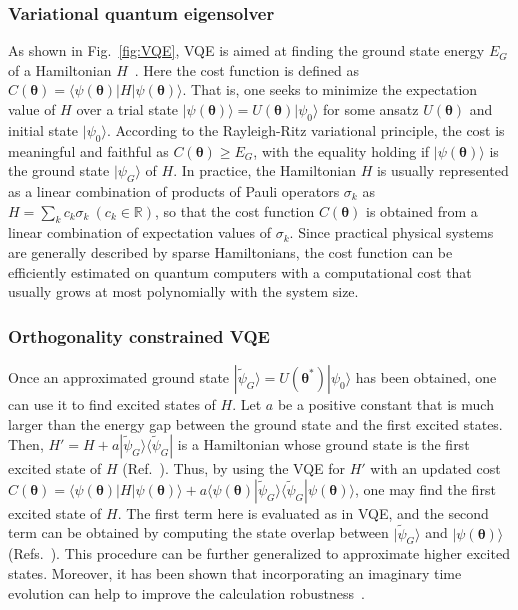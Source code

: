 \documentclass[prx,twocolumn,floatfix,superscriptaddress,longbibliography]{revtex4-1}
\renewcommand{\vec}[1]{\boldsymbol{#1}}  %
\newcommand{\<}{\langle}
\renewcommand{\>}{\rangle}
\newcommand{\ket}[1]{|#1\rangle}               %
\newcommand{\bra}[1]{\langle #1|}              %
\renewcommand{\geq}{\geqslant}
\renewcommand{\vec}[1]{\boldsymbol{#1}}  %
\begin{document}
\subsubsection{ Variational quantum eigensolver}  As shown in Fig.~\ref{fig:VQE}, VQE  is aimed at finding the ground state energy $E_G$ of a Hamiltonian $H$~\cite{VQE}. Here the cost function is defined as $C(\vec{\theta})=\bra{\psi(\vec{\theta})}H \ket{\psi(\vec{\theta})}$. That is, one seeks to minimize the expectation value of $H$ over a trial state $\ket{\psi(\vec{\theta})}=U(\vec{\theta})\ket{\psi_0}$ for some ansatz $U(\vec{\theta})$ and initial state $\ket{\psi_0}$. According to the Rayleigh-Ritz variational principle, the cost is meaningful and faithful as $C(\vec{\theta})\geq E_G$, with the equality holding if $\ket{\psi(\vec{\theta})}$ is the ground state $\ket{\psi_G}$ of $H$. In practice, the Hamiltonian $H$ is usually represented as a linear combination of products of Pauli operators $\sigma_k$ as $H=\sum_k c_k \sigma_k~(c_k \in \mathbb{R})$, so that the cost function $C(\vec{\theta})$ is obtained from a linear combination of expectation values of $\sigma_k$. Since practical physical systems are generally described by sparse Hamiltonians, the cost function can be efficiently estimated on quantum computers with a computational cost that usually grows at most polynomially with the system size. 
  

    
\subsubsection{ Orthogonality constrained VQE} Once an approximated ground state $\ket{\tilde{\psi}_G}=U(\vec{\theta}^*)\ket{\psi_0}$ has been obtained, one can use it to find excited states of $H$. Let $a$ be a positive constant that is much larger than the energy gap between the ground state and the first excited states. Then, $H'=H+a \ket{\tilde{\psi}_G}\bra{\tilde{\psi}_G}$ is a Hamiltonian whose ground state is the first excited state of $H$ (Ref.~\cite{higgott2019variational}). Thus, by using the VQE for $H'$ with an updated cost  $C(\vec{\theta})=\bra{\psi(\vec{\theta})}H \ket{\psi(\vec{\theta})}+a \langle \psi(\vec{\theta})| \tilde{\psi}_G\rangle \langle \tilde{\psi}_G|\psi(\vec{\theta}) \rangle $, one may find the first excited state of $H$. The first term here is evaluated as in VQE, and the second term can be obtained by computing the state overlap between $| \tilde{\psi}_G\rangle$ and $|\psi(\vec{\theta}) \rangle$ (Refs.~\cite{buhrman2001quantum,cincio2018learning}). This procedure can be further generalized to approximate higher excited states. Moreover, it has been shown that incorporating an imaginary time evolution can help to improve the calculation robustness~\cite{jones2019variational}. 
\end{document}
